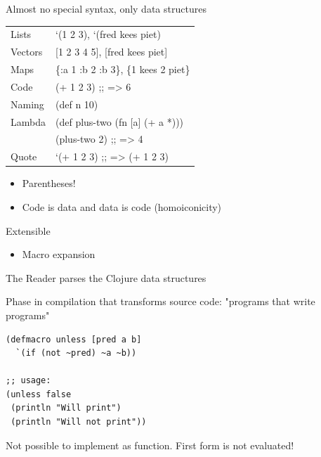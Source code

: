 \documentclass[presentation]{beamer}
\begin{document}
\begin{frame}[label=sec-1-2]{Almost no special syntax, only data structures}
\begin{center}
\begin{tabular}{ll}
Lists & \alert{`(1 2 3)}, \alert{`(fred kees piet)}\\
Vectors & \alert{[1 2 3 4 5]}, \alert{[fred kees piet]}\\
Maps & \alert{\{:a 1 :b 2 :b 3\}}, \alert{\{1 kees 2 piet\}}\\
Code & \alert{(+ 1 2 3)}  \alert{;; => 6}\\
Naming & \alert{(def n 10)}\\
Lambda & \alert{(def plus-two (fn [a] (+ a *)))}\\
 & \alert{(plus-two 2)} \alert{;; => 4}\\
Quote & \alert{`(+ 1 2 3)} \alert{;; => (+ 1 2 3)}\\
\end{tabular}
\end{center}
\begin{itemize}
\item Parentheses!
\item Code is data and data is code (homoiconicity)
\end{itemize}
\end{frame}


\begin{frame}[label=sec-1-3]{Extensible}
\begin{itemize}
\item Macro expansion
\end{itemize}
\end{frame}

\begin{frame}[label=sec-1-4]{The Reader parses the Clojure data structures}
\end{frame}
\begin{frame}[fragile,label=sec-1-5]{Phase in compilation that transforms source code: "programs that write programs"}
 \begin{verbatim}
(defmacro unless [pred a b]
  `(if (not ~pred) ~a ~b))

;; usage:
(unless false 
 (println "Will print") 
 (println "Will not print"))
\end{verbatim}

Not possible to implement as function.
First form is not evaluated!
\end{frame}
\end{document}
